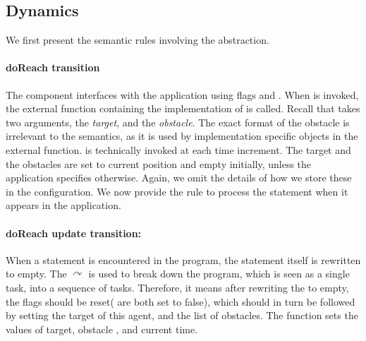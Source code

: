\subsection{Dynamics}
\label{sect:dynamics}
We first present the semantic rules involving the  abstraction. 

\paragraph{doReach transition}
The  component interfaces with the application using flags  and . When  is invoked, the external function containing the implementation of  is called. Recall that  takes two arguments, the \emph{target}, and the \emph{obstacle}. The exact format of the obstacle is irrelevant to the semantics, as it is used by implementation specific objects in the  external function.  is technically invoked at each time increment. The target and the obstacles are set to current position and empty initially, unless the application specifies otherwise. Again, we omit the details of how we store these in the configuration. We now provide the rule to process the  statement when it appears in the application. 


\paragraph{doReach update transition: }When a  statement is encountered in the program, the statement itself is rewritten to empty. The $\curvearrowright$ is used to break down the program, which is seen as a single task, into a sequence of tasks. Therefore, it means after rewriting the  to empty, the  flags should be reset( are both set to false), which should in turn be followed by setting the target of this agent, and the list of obstacles. The  function sets the values of target, obstacle , and current time. 
\begin{figure}
\label{fig:lock1}
\end{figure}
\vspace{-2mm}
